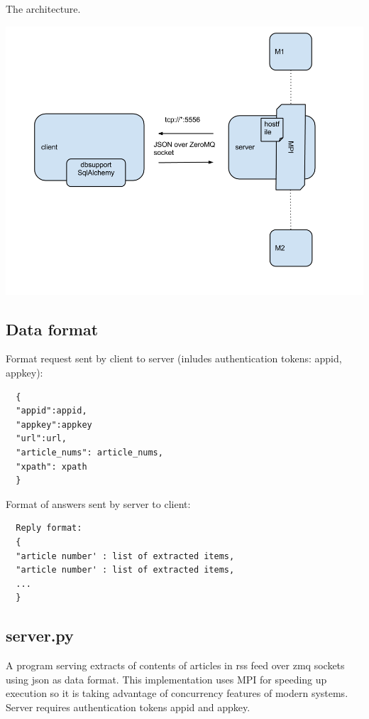 \documentclass[a4paper,12pt]{article}
\begin{document}
The architecture.
\begin{center}
 \includegraphics[width=\textwidth,height=\textheight,keepaspectratio]{prirdiagram.png}
\end{center}

\subsection{Data format}

  Format request sent by client to server (inludes authentication tokens: appid, appkey):
  \begin{verbatim}
  {
  "appid":appid,
  "appkey":appkey
  "url":url,
  "article_nums": article_nums,
  "xpath": xpath
  }
  \end{verbatim}
  
  Format of answers sent by server to client:

  \begin{verbatim}
  Reply format:
  {
  "article number' : list of extracted items,
  "article number' : list of extracted items,
  ...
  }
  \end{verbatim}
  
\subsection{server.py}

A program serving extracts of contents of articles in rss feed over zmq
sockets using json as data format.  This implementation uses MPI for
speeding up execution so it is taking advantage of concurrency features
of modern systems. Server requires authentication tokens appid and appkey.
\end{document}
